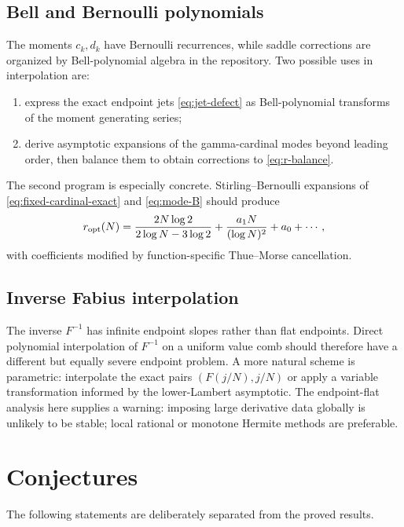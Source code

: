 \documentclass[11pt,oneside]{article}
\theoremstyle{definition}
\theoremstyle{remark}
\begin{document}
\subsection{Bell and Bernoulli polynomials}

The moments $c_k,d_k$ have Bernoulli recurrences, while saddle corrections are organized by
Bell-polynomial algebra in the repository.  Two possible uses in interpolation are:

\begin{enumerate}
\item express the exact endpoint jets \eqref{eq:jet-defect} as Bell-polynomial transforms of
the moment generating series;
\item derive asymptotic expansions of the gamma-cardinal modes beyond leading order, then
balance them to obtain corrections to \eqref{eq:r-balance}.
\end{enumerate}

The second program is especially concrete.  Stirling--Bernoulli expansions of
\eqref{eq:fixed-cardinal-exact} and \eqref{eq:mode-B} should produce
\begin{equation}
 r_{\rm opt}(N)=\frac{2N\log2}{2\log N-3\log2}
 +\frac{a_1N}{(\log N)^2}+a_0+\cdots,
 \label{eq:r-corrected-form}
\end{equation}
with coefficients modified by function-specific Thue--Morse cancellation.

\subsection{Inverse Fabius interpolation}

The inverse $F^{-1}$ has infinite endpoint slopes rather than flat endpoints.  Direct
polynomial interpolation of $F^{-1}$ on a uniform value comb should therefore have a
different but equally severe endpoint problem.  A more natural scheme is parametric:
interpolate the exact pairs $(F(j/N),j/N)$ or apply a variable transformation informed by
the lower-Lambert asymptotic.  The endpoint-flat analysis here supplies a warning: imposing
large derivative data globally is unlikely to be stable; local rational or monotone Hermite
methods are preferable.

\section{Conjectures}
\label{sec:conjectures}

The following statements are deliberately separated from the proved results.
\end{document}
